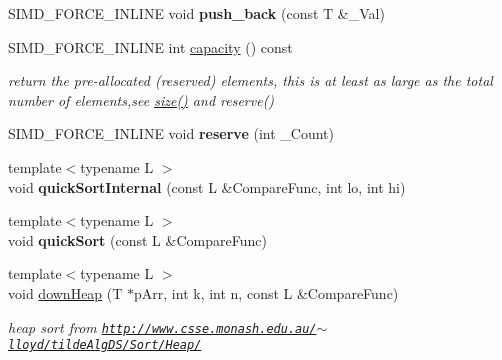 \begin{DoxyCompactItemize}
\item 
\mbox{\label{classbtAlignedObjectArray_ad61e10166e2c00f487095d3482b9edd1}} 
S\+I\+M\+D\+\_\+\+F\+O\+R\+C\+E\+\_\+\+I\+N\+L\+I\+NE void {\bfseries push\+\_\+back} (const T \&\+\_\+\+Val)
\item 
\mbox{\label{classbtAlignedObjectArray_a1baf76f9f52df3c2d742194ba33e8788}} 
S\+I\+M\+D\+\_\+\+F\+O\+R\+C\+E\+\_\+\+I\+N\+L\+I\+NE int \hyperlink{classbtAlignedObjectArray_a1baf76f9f52df3c2d742194ba33e8788}{capacity} () const
\begin{DoxyCompactList}\small\item\em return the pre-\/allocated (reserved) elements, this is at least as large as the total number of elements,see \hyperlink{classbtAlignedObjectArray_a31de8d83d29c6edd1493fc583091194c}{size()} and reserve() \end{DoxyCompactList}\item 
\mbox{\label{classbtAlignedObjectArray_a0bcdc850355c6742c66d50b16b102d9d}} 
S\+I\+M\+D\+\_\+\+F\+O\+R\+C\+E\+\_\+\+I\+N\+L\+I\+NE void {\bfseries reserve} (int \+\_\+\+Count)
\item 
\mbox{\label{classbtAlignedObjectArray_afd02193777d3644c1202bd430cd47ec3}} 
{\footnotesize template$<$typename L $>$ }\\void {\bfseries quick\+Sort\+Internal} (const L \&Compare\+Func, int lo, int hi)
\item 
\mbox{\label{classbtAlignedObjectArray_a96e9890d9c406d43b53b0e5ff0723b2f}} 
{\footnotesize template$<$typename L $>$ }\\void {\bfseries quick\+Sort} (const L \&Compare\+Func)
\item 
\mbox{\label{classbtAlignedObjectArray_af763a60de2f11089bb10ebff2c062642}} 
{\footnotesize template$<$typename L $>$ }\\void \hyperlink{classbtAlignedObjectArray_af763a60de2f11089bb10ebff2c062642}{down\+Heap} (T $\ast$p\+Arr, int k, int n, const L \&Compare\+Func)
\begin{DoxyCompactList}\small\item\em heap sort from \href{http://www.csse.monash.edu.au/~lloyd/tildeAlgDS/Sort/Heap/}{\tt http\+://www.\+csse.\+monash.\+edu.\+au/$\sim$lloyd/tilde\+Alg\+D\+S/\+Sort/\+Heap/} \end{DoxyCompactList}\item 

\end{DoxyCompactItemize}
